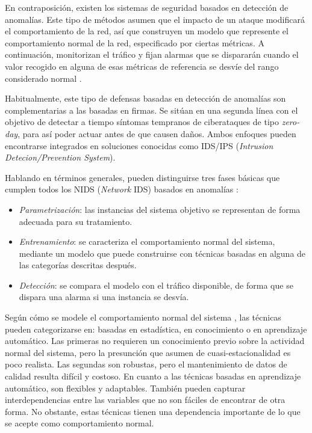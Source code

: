 En contraposición, existen los sistemas de seguridad basados en detección de anomalías.
Este tipo de métodos asumen que el impacto de un ataque modificará el comportamiento de la red, así que construyen un modelo que represente el comportamiento normal de la red, especificado por ciertas métricas.
A continuación, monitorizan el tráfico y fijan alarmas que se dispararán cuando el valor recogido en alguna de esas métricas de referencia se desvíe del rango considerado normal \cite{Boutaba_2018}.

Habitualmente, este tipo de defensas basadas en detección de anomalías son complementarias a las basadas en firmas.
Se sitúan en una segunda línea con el objetivo de detectar a tiempo síntomas tempranos de ciberataques de tipo \emph{zero-day}, para así poder actuar antes de que causen daños.
Ambos enfoques pueden encontrarse integrados en soluciones conocidas como IDS/IPS (\emph{Intrusion Detecion/Prevention System}).

Hablando en términos generales, pueden distinguirse tres fases básicas que cumplen todos los NIDS (\emph{Network} IDS) basados en anomalías \cite{GarciaTeodoro_2009}:
\begin{itemize}
    \item \emph{Parametrización}: las instancias del sistema objetivo se representan de forma adecuada para su tratamiento.
    \item \emph{Entrenamiento}: se caracteriza el comportamiento normal del sistema, mediante un modelo que puede construirse con técnicas basadas en alguna de las categorías descritas después.
    \item \emph{Detección}: se compara el modelo con el tráfico disponible, de forma que se dispara una alarma si una instancia se desvía.
\end{itemize}

Según cómo se modele el comportamiento normal del sistema \cite{Lazaveric_2005}, las técnicas pueden categorizarse en: basadas en estadística, en conocimiento o en aprendizaje automático.
Las primeras no requieren un conocimiento previo sobre la actividad normal del sistema, pero la presunción que asumen de cuasi-estacionalidad es poco realista.
Las segundas son robustas, pero el mantenimiento de datos de calidad resulta difícil y costoso.
En cuanto a las técnicas basadas en aprendizaje automático, son flexibles y adaptables.
También pueden capturar interdependencias entre las variables que no son fáciles de encontrar de otra forma.
No obstante, estas técnicas tienen una dependencia importante de lo que se acepte como comportamiento normal.

